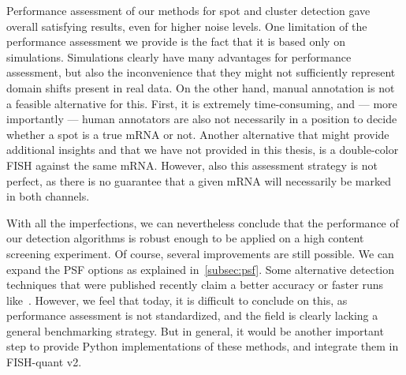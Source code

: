 Performance assessment of our methods for spot and cluster detection gave overall satisfying results, even for higher noise levels.
One limitation of the performance assessment we provide is the fact that it is based only on simulations.
Simulations clearly have many advantages for performance assessment, but also the inconvenience that they might not sufficiently represent domain shifts present in real data.
On the other hand, manual annotation is not a feasible alternative for this.
First, it is extremely time-consuming, and --- more importantly --- human annotators are also not necessarily in a position to decide whether a spot is a true \ac{mRNA} or not.
Another alternative that might provide additional insights and that we have not provided in this thesis, is a double-color \ac{FISH} against the same \ac{mRNA}.
However, also this assessment strategy is not perfect, as there is no guarantee that a given \ac{mRNA} will necessarily be marked in both channels.

With all the imperfections, we can nevertheless conclude that the performance of our detection algorithms is robust enough to be applied on a high content screening experiment.
Of course, several improvements are still possible.
We can expand the \ac{PSF} options as explained in~\ref{subsec:psf}.
Some alternative detection techniques that were published recently claim a better accuracy or faster runs like~\cite{bahry_rs-fish_2021, bouilhol_deepspot_2022}.
However, we feel that today, it is difficult to conclude on this, as performance assessment is not standardized, and the field is clearly lacking a general benchmarking strategy.
But in general, it would be another important step to provide Python implementations of these methods, and integrate them in FISH-quant v2.

